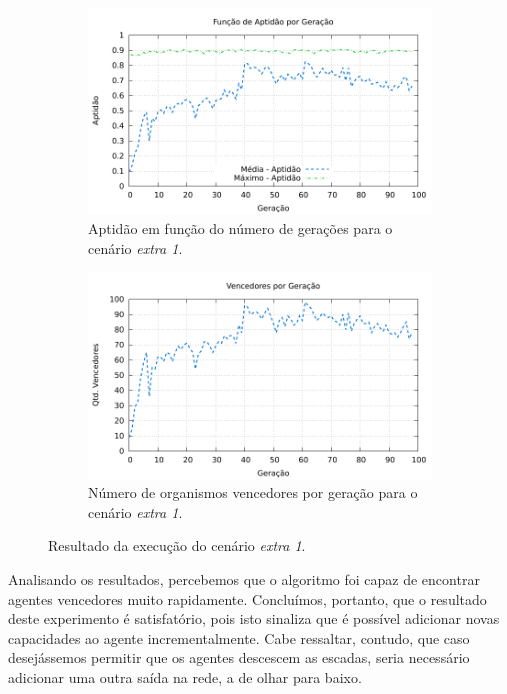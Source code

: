 \begin{figure}[H]
\centering
	\begin{subfigure}[b]{0.45\textwidth}
        \includegraphics[width=\textwidth]{fig/extra1-fitness.pdf}
        \caption{Aptidão em função do número de gerações para o cenário
        \textit{extra 1}.}
	\end{subfigure}
	\begin{subfigure}[b]{0.45\textwidth}
        \includegraphics[width=\textwidth]{fig/extra1-winners.pdf}
        \caption{Número de organismos vencedores por geração para o cenário
        \textit{extra 1}.}
	\end{subfigure}

    \caption{Resultado da execução do cenário \textit{extra 1}.}
	\label{fig:extra1-results}
\end{figure}

Analisando os resultados, percebemos que o algoritmo foi capaz de encontrar
agentes vencedores muito rapidamente. Concluímos, portanto, que o resultado
deste experimento é satisfatório, pois isto sinaliza que é possível adicionar
novas capacidades ao agente incrementalmente. Cabe ressaltar, contudo, que caso
desejássemos permitir que os agentes descescem as escadas, seria necessário
adicionar uma outra saída na rede, a de olhar para baixo.

